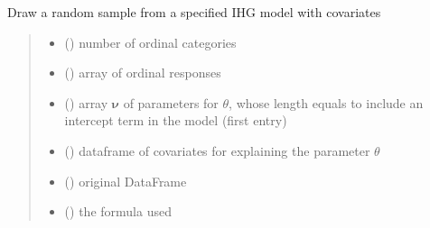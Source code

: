 \documentclass[letterpaper,10pt,english]{sphinxmanual}
\begin{document}
\begin{fulllineitems}
\label{\detokenize{cubmods:cubmods.ihg_v.draw}}
\pysigstartsignatures
{}
\pysigstopsignatures
\sphinxAtStartPar
Draw a random sample from a specified IHG model with covariates
\begin{quote}\begin{description}
\begin{itemize}
\item {} 
\sphinxAtStartPar
{} () \textendash{} number of ordinal categories

\item {} 
\sphinxAtStartPar
{} () \textendash{} array of ordinal responses

\item {} 
\sphinxAtStartPar
{} () \textendash{} array \(\pmb \nu\) of parameters for \(\theta\), whose length equals 
 to include an intercept term in the model (first entry)

\item {} 
\sphinxAtStartPar
{} () \textendash{} dataframe of covariates for explaining the parameter \(\theta\)

\item {} 
\sphinxAtStartPar
{} () \textendash{} original DataFrame

\item {} 
\sphinxAtStartPar
{} () \textendash{} the formula used


\end{itemize}
\end{description}
\end{quote}
\end{fulllineitems}
\end{document}
